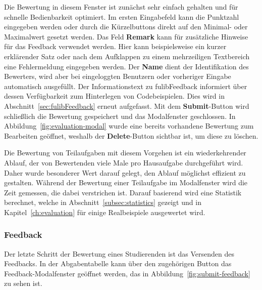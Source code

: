 Die Bewertung in diesem Fenster ist zunächst sehr einfach gehalten und für schnelle Bedienbarkeit optimiert.
Im ersten Eingabefeld kann die Punktzahl eingegeben werden oder durch die Kürzelbuttons direkt auf den Minimal- oder Maximalwert gesetzt werden.
Das Feld \textbf{Remark} kann für zusätzliche Hinweise für das Feedback verwendet werden.
Hier kann beispielsweise ein kurzer erklärender Satz oder nach dem Aufklappen zu einem mehrzeiligen Textbereich eine Fehlermeldung eingegeben werden.
Der \textbf{Name} dient der Identifikation des Bewerters, wird aber bei eingeloggten Benutzern oder vorheriger Eingabe automatisch ausgefüllt.
Der Informationstext zu fulibFeedback informiert über dessen Verfügbarkeit zum Hinterlegen von Codebeispielen.
Dies wird in Abschnitt~\ref{sec:fulibFeedback} erneut aufgefasst.
Mit dem \textbf{Submit}-Button wird schließlich die Bewertung gespeichert und das Modalfenster geschlossen.
In Abbildung~\ref{fig:evaluation-modal} wurde eine bereits vorhandene Bewertung zum Bearbeiten geöffnet, weshalb der \textbf{Delete}-Button sichtbar ist, um diese zu löschen.

Die Bewertung von Teilaufgaben mit diesem Vorgehen ist ein wiederkehrender Ablauf, der von Bewertenden viele Male pro Hausaufgabe durchgeführt wird.
Daher wurde besonderer Wert darauf gelegt, den Ablauf möglichst effizient zu gestalten.
Während der Bewertung einer Teilaufgabe im Modalfenster wird die Zeit gemessen, die dabei verstrichen ist.
Darauf basierend wird eine Statistik berechnet, welche in Abschnitt~\ref{subsec:statistics} gezeigt und in Kapitel~\ref{ch:evaluation} für einige Realbeispiele ausgewertet wird.

\subsubsection{Feedback}

Der letzte Schritt der Bewertung eines Studierenden ist das Versenden des Feedbacks.
In der Abgabentabelle kann über den zugehörigen Button das Feedback-Modalfenster geöffnet werden, das in Abbildung~\ref{fig:submit-feedback} zu sehen ist.

